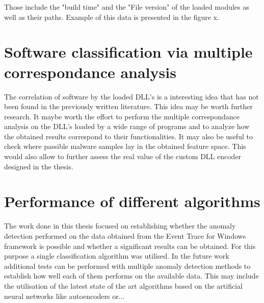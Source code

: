 \documentclass[a4paper,twoside,12pt]{book}
\begin{document}
Those include the "build time" and the "File version" of the loaded modules as well as their paths.
Example of this data is presented in the figure x.

\section{Software classification via multiple correspondance analysis}

The correlation of software by the loaded DLL's is a interesting idea that has not been
found in the previously written literature. This idea may be worth further research. It maybe worth
the effort to perform the multiple correspondance analysis on the DLL's loaded by a wide range 
of programs and to analyze how the obtained results correspond to their functionalities. It may also
be useful to check where passible malware samples lay in the obtained feature space. This would also
allow to further assess the real value of the custom DLL encoder designed in the thesis. 

\section{Performance of different algorithms}

The work done in this thesis focused on establishing whether the anomaly detection performed on the
data obtained from the Event Trace for Windows framework is possible and whether a significant results
can be obtained. For this purpose a single classification algorithm was utilised. In the future work 
additional tests can be performed with multiple anomaly detection methods to establish how well each 
of them performs on the available data. This may include the utilisation of the latest state of the 
art algorithms based on the artificial neural networks like autoencoders or...



\end{document}
